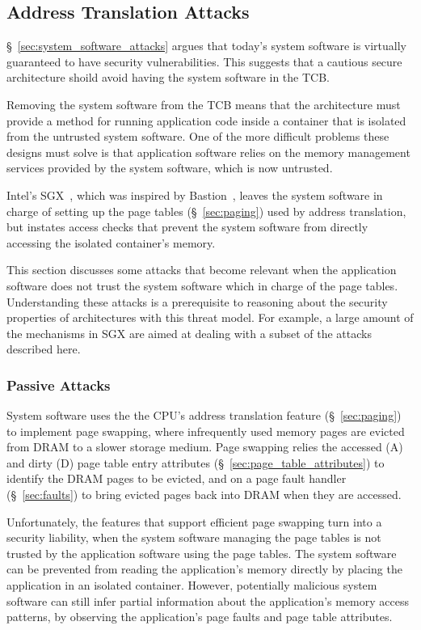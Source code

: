\subsection{Address Translation Attacks}
\label{sec:paging_attacks}

\S~\ref{sec:system_software_attacks} argues that today's system software is
virtually guaranteed to have security vulnerabilities. This suggests that a
cautious secure architecture shoild avoid having the system software in the
TCB.

Removing the system software from the TCB means that the architecture must
provide a method for running application code inside a container that is
isolated from the untrusted system software. One of the more difficult problems
these designs must solve is that application software relies on the memory
management services provided by the system software, which is now untrusted.

Intel's SGX~\cite{mckeen2013sgx, anati2013sgx}, which was inspired by
Bastion~\cite{champagne2010bastion}, leaves the system software in charge of
setting up the page tables (\S~\ref{sec:paging}) used by address translation,
but instates access checks that prevent the system software from directly
accessing the isolated container's memory.

This section discusses some attacks that become relevant when the application
software does not trust the system software which in charge of the page tables.
Understanding these attacks is a prerequisite to reasoning about the security
properties of architectures with this threat model. For example, a large amount
of the mechanisms in SGX are aimed at dealing with a subset of the attacks
described here.


\subsubsection{Passive Attacks}
\label{sec:fault_tracking_attacks}

System software uses the the CPU's address translation feature
(\S~\ref{sec:paging}) to implement page swapping, where infrequently used
memory pages are evicted from DRAM to a slower storage medium. Page swapping
relies the accessed (A) and dirty (D) page table entry attributes
(\S~\ref{sec:page_table_attributes}) to identify the DRAM pages to be evicted,
and on a page fault handler (\S~\ref{sec:faults}) to bring evicted pages back
into DRAM when they are accessed.

Unfortunately, the features that support efficient page swapping turn into a
security liability, when the system software managing the page tables is not
trusted by the application software using the page tables. The system software
can be prevented from reading the application's memory directly by placing the
application in an isolated container. However, potentially malicious system
software can still infer partial information about the application's memory
access patterns, by observing the application's page faults and page table
attributes.

